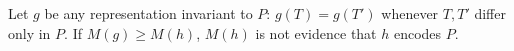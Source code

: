 \begin{corollary}
\label{prop:falsification}
Let $g$ be any representation invariant to $P$: $g(T)=g(T')$ whenever $T,T'$ differ only in $P$. If $M(g)\ge M(h)$, $M(h)$ is not evidence that $h$ encodes $P$.
\end{corollary}

